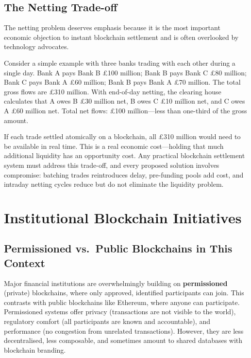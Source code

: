 \documentclass[11pt,a4paper]{article}
\newcommand{\keyword}[1]{\textbf{\textcolor{AccentOrange}{#1}}}
\begin{document}
\subsection{The Netting Trade-off}

The netting problem deserves emphasis because it is the most important economic objection to instant blockchain settlement and is often overlooked by technology advocates.

Consider a simple example with three banks trading with each other during a single day. Bank A pays Bank B \pounds 100 million; Bank B pays Bank C \pounds 80 million; Bank C pays Bank A \pounds 60 million; Bank B pays Bank A \pounds 70 million. The total gross flows are \pounds 310 million. With end-of-day netting, the clearing house calculates that A owes B \pounds 30 million net, B owes C \pounds 10 million net, and C owes A \pounds 60 million net. Total net flows: \pounds 100 million---less than one-third of the gross amount.

If each trade settled atomically on a blockchain, all \pounds 310 million would need to be available in real time. This is a real economic cost---holding that much additional liquidity has an opportunity cost. Any practical blockchain settlement system must address this trade-off, and every proposed solution involves compromise: batching trades reintroduces delay, pre-funding pools add cost, and intraday netting cycles reduce but do not eliminate the liquidity problem.

\section{Institutional Blockchain Initiatives}

\subsection{Permissioned vs.\ Public Blockchains in This Context}

Major financial institutions are overwhelmingly building on \keyword{permissioned} (private) blockchains, where only approved, identified participants can join. This contrasts with public blockchains like Ethereum, where anyone can participate. Permissioned systems offer privacy (transactions are not visible to the world), regulatory comfort (all participants are known and accountable), and performance (no congestion from unrelated transactions). However, they are less decentralised, less composable, and sometimes amount to shared databases with blockchain branding.
\end{document}

